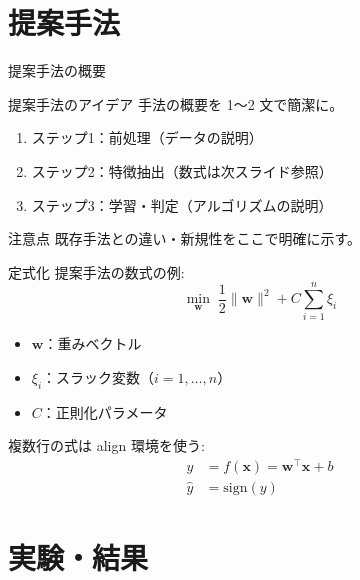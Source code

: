 \documentclass[uplatex,dvipdfmx,aspectratio=169]{beamer}
\begin{document}
\section{提案手法}

\begin{frame}{提案手法の概要}
  \begin{block}{提案手法のアイデア}
    手法の概要を 1〜2 文で簡潔に。
  \end{block}
  \begin{enumerate}
    \item ステップ1：前処理（データの説明）
    \item ステップ2：特徴抽出（数式は次スライド参照）
    \item ステップ3：学習・判定（アルゴリズムの説明）
  \end{enumerate}
  \pause
  \begin{alertblock}{注意点}
    既存手法との違い・新規性をここで明確に示す。
  \end{alertblock}
\end{frame}

\begin{frame}{定式化}
  提案手法の数式の例:
  \begin{equation}
    \label{eq:objective}
    \min_{\bm{w}} \; \frac{1}{2}\|\bm{w}\|^2 + C\sum_{i=1}^{n}\xi_i
  \end{equation}
  \begin{itemize}
    \item $\bm{w}$：重みベクトル
    \item $\xi_i$：スラック変数（$i=1,\dots,n$）
    \item $C$：正則化パラメータ
  \end{itemize}
  \pause
  複数行の式は align 環境を使う:
  \begin{align}
    y &= f(\bm{x}) = \bm{w}^{\top}\bm{x} + b \\
    \hat{y} &= \mathrm{sign}(y)
  \end{align}
\end{frame}

\section{実験・結果}
\end{document}
